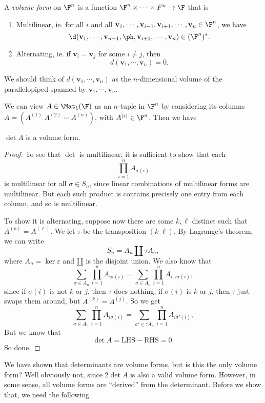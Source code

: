 \documentclass[a4paper]{article}
\begin{document}
\begin{defi}
  A \emph{volume form} on $\F^n$ is a function $\F^n \times \cdots \times F^n \to \F$ that is
  \begin{enumerate}
    \item Multilinear, ie. for all $i$ and all $\mathbf{v}_1, \cdots, \mathbf{v}_{i - 1}, \mathbf{v}_{i + 1}, \cdots, \mathbf{v}_n \in \F^n$, we have
      \[
        \d (\mathbf{v}_1, \cdots, \mathbf{v}_{n - 1}, \ph, \mathbf{v}_{i + 1}, \cdots, \mathbf{v}_n) \in (\F^n)^*.
      \]
    \item Alternating, ie. if $\mathbf{v}_i = \mathbf{v}_j$ for some $i \not= j$, then
      \[
        d(\mathbf{v}_1, \cdots, \mathbf{v}_n) = 0.
      \]
  \end{enumerate}
\end{defi}
We should think of $d(\mathbf{v}_1, \cdots, \mathbf{v}_n)$ as the $n$-dimensional volume of the parallelopiped spanned by $\mathbf{v}_1, \cdots, \mathbf{v}_n$.

We can view $A \in \Mat_1(\F)$ as an $n$-tuple in $\F^n$ by considering its columns $A = (A^{(1)}\; A^{(2)}\; \cdots \; A^{(n)})$, with $A^{(i)} \in \F^n$. Then we have
\begin{lemma}
  $\det A$ is a volume form.
\end{lemma}

\begin{proof}
  To see that $\det$ is multilinear, it is sufficient to show that each
  \[
    \prod_{i = 1}^n A_{\sigma(i)}
  \]
  is multilinear for all $\sigma \in S_n$, since linear combinations of multilinear forms are multilinear. But each such product is contains precisely one entry from each column, and so is multilinear.

  To show it is alternating, suppose now there are some $k, \ell$ distinct such that $A^{(k)} = A^{(\ell)}$. We let $\tau$ be the transposition $(k\; \ell)$. By Lagrange's theorem, we can write
  \[
    S_n = A_n \amalg \tau A_n,
  \]
  where $A_n = \ker \varepsilon$ and $\amalg$ is the disjoint union. We also know that
  \[
    \sum_{\sigma \in A_n} \prod_{i = 1}^n A_{i \sigma (i)} = \sum_{\sigma \in A_n} \prod_{i = 1}^n A_{i, \tau\sigma(i)},
  \]
  since if $\sigma(i)$ is not $k$ or $j$, then $\tau$ does nothing; if $\sigma(i)$ is $k$ or $j$, then $\tau$ just swaps them around, but $A^{(k)} = A^{(j)}$. So we get
  \[
    \sum_{\sigma \in A_n} \prod_{i = 1}^n A_{i \sigma (i)} = \sum_{\sigma' \in \tau A_n} \prod_{i = 1}^n A_{i\sigma'(i)},
  \]
  But we know that
  \[
    \det A = \text{LHS} - \text{RHS} = 0.
  \]
  So done.
\end{proof}
We have shown that determinants are volume forms, but is this the only volume form? Well obviously not, since $2 \det A$ is also a valid volume form. However, in some sense, all volume forms are ``derived'' from the determinant. Before we show that, we need the following
\end{document}
